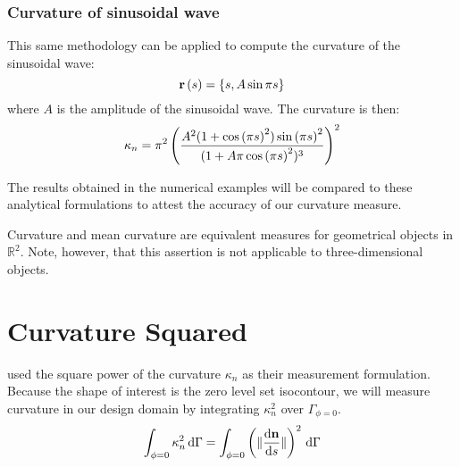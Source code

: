 
\subsubsection{Curvature of sinusoidal wave}
\label{sec:curvature_sinusoidal_wave}

This same methodology can be applied to compute the curvature of the sinusoidal wave:
%
\begin{equation}
	\centering
	\label{eq:parametric_sin_wave}
	\mathbf{r} \left( s \right) = \lbrace s, A \sin \pi s \rbrace
\end{equation}
%
where $A$ is the amplitude of the sinusoidal wave. The curvature is then:
%
\begin{equation}
	\centering
	\label{eq:sin_wave_curvature_solution}
	\kappa_{n} = \pi^2 \left(\frac{A^2 ( 1 + \cos{\left(\pi s\right)}^2 ) \sin{\left(\pi s\right)}^2}{{( 1 + A \pi \cos{\left(\pi s\right)}^2} ) ^ 3}\right)^2
\end{equation}

The results obtained in the numerical examples will be compared to these analytical formulations to attest the accuracy of our curvature measure.

Curvature and mean curvature are equivalent measures for geometrical objects in $\mathbb{R}^2$. Note, however, that this assertion is not applicable to three-dimensional objects.


\section{Curvature Squared}
\label{eq:curvature_squared}

\citep{DHK+:01,NTG+:14,OB:12} used the square power of the curvature $\kappa_{n}$ as their measurement formulation. Because the shape of interest is the zero level set isocontour, we will measure curvature in our design domain by integrating $\kappa_{n}^2$ over $\Gamma_{\phi=0}$.
%
\begin{equation}
	\centering
	\label{eq:curvature_integral}
	\int_{\phi=0} \kappa_{n}^2 \,\mathrm{d}\Gamma = \int_{\phi=0} \left(\Vert \frac{\mathrm{d}\mathbf{n}}{\mathrm{d}s} \Vert\right)^2 \,\mathrm{d}\Gamma
\end{equation}
%

